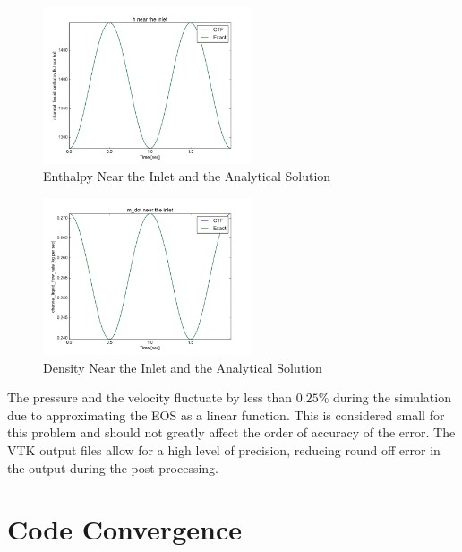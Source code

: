 \begin{figure}[!h]
	\centering
	\includegraphics[width=0.55\textwidth]{images/Code_Verification/run_00_00/residual/results/Inlet_h.png}
	\caption{Enthalpy Near the Inlet and the Analytical Solution}
	\label{fig:Inlet_h}
\end{figure}

\begin{figure}[!h]
	\centering
	\includegraphics[width=0.55\textwidth]{images/Code_Verification/run_00_00/residual/results/Inlet_m_dot.png}
	\caption{Density Near the Inlet and the Analytical Solution}
	\label{fig:Inlet_m_dot}
\end{figure}

 The pressure and the velocity fluctuate by less than $0.25\%$ during the
 simulation due to approximating the EOS as a linear function. This is considered small for
 this problem and should not greatly affect the order of accuracy of the error. 
 The VTK output files allow for a high level of precision, reducing
 round off error in the output during the post processing.

\section{Code Convergence}

